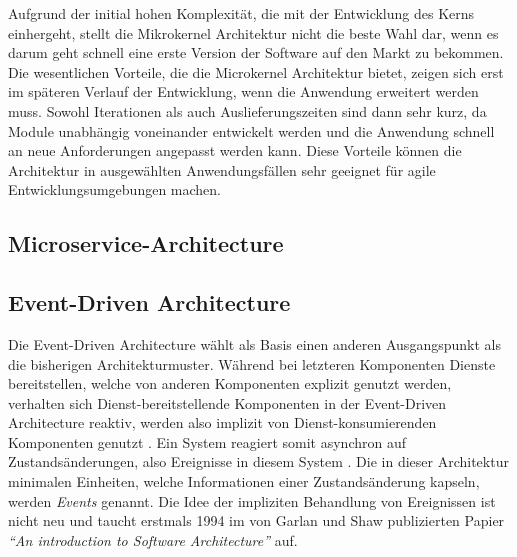 \documentclass[acmtog]{acmart}
\begin{document}
Aufgrund der initial hohen Komplexität, die mit der Entwicklung des Kerns einhergeht, stellt die Mikrokernel Architektur nicht die beste Wahl dar, wenn es darum geht schnell eine erste Version der Software auf den Markt zu bekommen.
Die wesentlichen Vorteile, die die Microkernel Architektur bietet, zeigen sich erst im späteren Verlauf der Entwicklung, wenn die Anwendung erweitert werden muss.
Sowohl Iterationen als auch Auslieferungszeiten sind dann sehr kurz, da Module unabhängig voneinander entwickelt werden und die Anwendung schnell an neue Anforderungen angepasst werden kann.
Diese Vorteile können die Architektur in ausgewählten Anwendungsfällen sehr geeignet für agile Entwicklungsumgebungen machen.

\subsection{Microservice-Architecture}
\label{subsec:microservice}

\subsection{Event-Driven Architecture}
\label{subsec:eda}
Die Event-Driven Architecture wählt als Basis einen anderen Ausgangspunkt als die bisherigen Architekturmuster.
Während bei letzteren Komponenten Dienste bereitstellen, welche von anderen Komponenten explizit genutzt werden,
verhalten sich Dienst-bereitstellende Komponenten in der Event-Driven Architecture reaktiv,
werden also implizit von Dienst-konsumierenden Komponenten genutzt \cite{garlanShawImplizit}.
Ein System reagiert somit asynchron auf Zustandsänderungen, also Ereignisse in diesem System \cite{eda}.
Die in dieser Architektur minimalen Einheiten, welche Informationen einer Zustandsänderung kapseln, werden \textit{Events} genannt.
Die Idee der impliziten Behandlung von Ereignissen ist nicht neu und taucht erstmals 1994 im von Garlan und Shaw publizierten Papier
\textit{\enquote{An introduction to Software Architecture}} auf.
\end{document}

